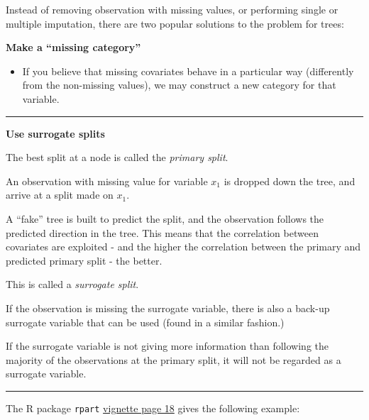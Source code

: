 \documentclass[
  letterpaper,
  DIV=11,
  numbers=noendperiod]{scrartcl}
\providecommand{\tightlist}{%
  \setlength{\itemsep}{0pt}\setlength{\parskip}{0pt}}\usepackage{longtable,booktabs,array}
\begin{document}
Instead of removing observation with missing values, or performing
single or multiple imputation, there are two popular solutions to the
problem for trees:

\textbf{Make a ``missing category''}

\begin{itemize}
\tightlist
\item
  If you believe that missing covariates behave in a particular way
  (differently from the non-missing values), we may construct a new
  category for that variable.
\end{itemize}

\begin{center}\rule{0.5\linewidth}{0.5pt}\end{center}

\textbf{Use surrogate splits}

The best split at a node is called the \emph{primary split}.

An observation with missing value for variable \(x_1\) is dropped down
the tree, and arrive at a split made on \(x_1\).

A ``fake'' tree is built to predict the split, and the observation
follows the predicted direction in the tree. This means that the
correlation between covariates are exploited - and the higher the
correlation between the primary and predicted primary split - the
better.

This is called a \emph{surrogate split}.

If the observation is missing the surrogate variable, there is also a
back-up surrogate variable that can be used (found in a similar
fashion.)

If the surrogate variable is not giving more information than following
the majority of the observations at the primary split, it will not be
regarded as a surrogate variable.

\begin{center}\rule{0.5\linewidth}{0.5pt}\end{center}

The R package \texttt{rpart}
\href{https://cran.r-project.org/web/packages/rpart/vignettes/longintro.pdf}{vignette
page 18} gives the following example:
\end{document}
